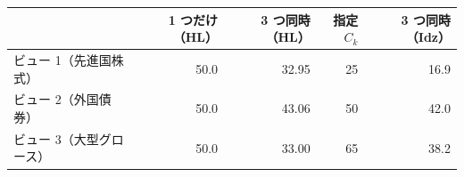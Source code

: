 \begin{tabular}{lrrrr}
\toprule
 & 1 つだけ（HL） & 3 つ同時（HL） & 指定 $C_k$ & 3 つ同時（Idz） \\
\midrule
ビュー 1（先進国株式） & 50.0 & 32.95 & 25 & 16.9 \\
ビュー 2（外国債券） & 50.0 & 43.06 & 50 & 42.0 \\
ビュー 3（大型グロース） & 50.0 & 33.00 & 65 & 38.2 \\
\bottomrule
\end{tabular}
